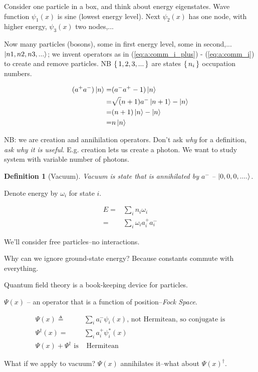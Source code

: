 \documentclass[]{article}
\newtheorem{defn}[thm]{Definition}
\begin{document}
Consider one particle in a box, and think about energy eigenstates. Wave function $\psi_1(x)$ is sine (lowest energy level). Next $\psi_2(x)$ has one node, with higher energy, $\psi_3(x)$ two nodes,...

Now many particles (bosons), some in first energy level, some in second,...$\ket{n1,n2,n3,...}$;  we invent operators as in (\ref{eq:a:comm_i_plus}) - (\ref{eq:a:comm_i}) to create and remove particles. NB $\set{1,2,3,...}$ are states $\set{n_i}$ occupation numbers.

\begin{align*}
(a^+a^-)\ket{n}=&(a^-a^+-1)\ket{n}\\
=&\sqrt(n+1)a^-\ket{n+1}-\ket{n}\\
=&(n+1)\ket{n}-\ket{n}\\
=&n\ket{n}
\end{align*}

NB: we are  creation and annihilation operators. Don't ask \emph{why} for a definition, \emph{ask why it is useful}. E.g. creation lets us create a photon. We want to study system with variable number of photons.

\begin{defn}[Vacuum]
	Vacuum is state that is annihilated by $a^-$ -- $\ket{0,0,0,....}$.
\end{defn}

Denote energy by $\omega_i$ for state $i$. 

\begin{align*}
E =& \sum_{i} n_i \omega_i\\
=& \sum_{i} \omega_i a^+_i a^-_i 
\end{align*}

We'll consider free particles--no interactions.

Why can we ignore ground-state energy? Because constants commute with everything. 

Quantum field theory is a book-keeping device for particles.

$\Psi(x)$ -- an operator that is a function of position--\emph{Fock Space}.

\begin{align*}
\Psi(x)\triangleq&\sum_{i}a^-_i\psi_i(x)\text{, not Hermitean, so conjugate is}\\
\Psi^\dagger(x)=&\sum_{i}a^+_i\psi_i^*(x)\\
\Psi(x)+\Psi^\dagger \text{ is}&\text{ Hermitean}
\end{align*}

What if we apply to vacuum? $\Psi(x)$ annihilates it--what about $\Psi(x)^\dagger$.
\end{document}
